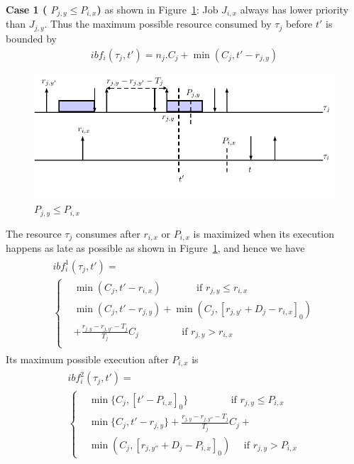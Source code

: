 \textbf{Case 1 ( $P_{j,y}\leq P_{i,x}$)} as shown in  Figure~\ref{fig:case1}: Job $J_{i,x}$ always has lower priority than  $J_{j,y}$. Thus   the maximum possible resource consumed by $\tau_{j}$  before $t'$ is  bounded by
	\begin{align*}
		ibf_i(\tau_j,t')=n_j.C_j +\min\left(C_j,t'-r_{j,y}\right)
	\end{align*}
 

\begin{figure}[h!]
 \centering
\includegraphics[scale=0.7]{Figure/C1}  
\caption{$ P_{j,y}\leq P_{i,x}$}
  \label{fig:case1}
\end{figure}

The resource $\tau_j$ consumes  after $r_{i,x}$ or $P_{i,x}$ is maximized when its execution happens as late as possible as shown in Figure~\ref{fig:case1}, and hence we have
	\begin{align*}
	\begin{split}
	ibf_{i}^1(\tau_j,t')=~~~~~~~~~~~~~~~~~~~~~~~~~~~~~~~~~~~~~~~~\\
	\begin{cases}
	&\min(C_j, t'-r_{i,x})~\mbox{~~~~~~~~~~if } r_{j,y}\leq r_{i,x}\\
	&\min(C_j, t'-r_{j,y})+\min(C_j,[r_{j,y'}+D_j-r_{i,x}]_0)\\
	&+\frac{r_{j,y}-r_{j,y'}-T_j}{T_j}C_j \mbox{~~~~~~~~~~~~~if~} r_{j,y}>r_{i,x}\\
	\end{cases}
	\end{split}
	\end{align*}
Its maximum possible execution after $P_{i,x}$ is
	\begin{align*}
	\begin{split}
	ibf_{i}^2(\tau_j,t')=~~~~~~~~~~~~~~~~~~~~~~~~~~~~~~~~~~~~~~\\
	\begin{cases}
	&\min\{C_j, [t'-P_{i,x}]_0\}\mbox{~~~~~~~~~~~~~if } r_{j,y}\leq P_{i,x}\\
	&\min\{C_j, t'-r_{j,y}\}+\frac{r_{j,y}-r_{j,y''}-T_j}{T_j}C_j+\\&\min(C_j,[r_{j,y''}+D_j-P_{i,x}]_0)  \mbox{~~~~if } r_{j,y}>P_{i,x}
	\end{cases}
	\end{split}
	\end{align*}





